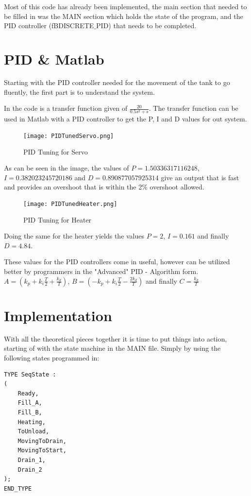 \documentclass[11pt]{essayStyle} %
\begin{document}
Most of this code has already been implemented, the main section that needed to be filled in was the MAIN section which holds the state of the program, and the PID controller (fBDISCRETE$\_$PID) that needs to be completed.


\section{PID \& Matlab}
Starting with the PID controller needed for the movement of the tank to go fluently, the first part is to understand the system.

In the code is a transfer function given of $\frac{20}{0.5s^{2}+s}$. The transfer function can be used 
in Matlab with a PID controller to get the P, I and D values for out system. 
\begin{figure}[h]
	\texttt{[image: PIDTunedServo.png]}
	\caption{PID Tuning for Servo}
\end{figure}

As can be seen in the image, the values of $P = 1.50336317116248$, $I = 0.382023245720186$ and $D = 0.890877057925314$ give an output that is fast and provides an overshoot that is within the 2\% overshoot allowed.

\begin{figure}[h]
	\texttt{[image: PIDTunedHeater.png]}
	\caption{PID Tuning for Heater}
\end{figure}

Doing the same for the heater yields the values $P=2$, $I=0.161$ and finally $D=4.84$.

These values for the PID controllers come in useful, however can be utilized better by programmers in the "Advanced" PID - Algorithm \cite{Oswald:ia} form. $A=(k_{p}+k_{i}\frac{T}{2}+\frac{k_{d}}{T})$, $B=(-k_{p}+k_{i}\frac{T}{2}-\frac{2k_{d}}{T})$ and finally $C=\frac{k_{d}}{T}$


\section{Implementation}
With all the theoretical pieces together it is time to put things into action, starting of with the state machine in the MAIN file. Simply by using the following states programmed in:
\lstset{language=C++}
\begin{lstlisting}
TYPE SeqState :
(
	Ready,
	Fill_A,
	Fill_B,
	Heating,
	ToUnload,
	MovingToDrain,
	MovingToStart,
	Drain_1,
	Drain_2
);
END_TYPE
\end{lstlisting}
\end{document}
